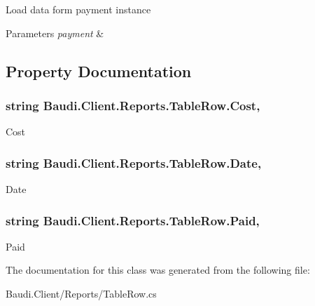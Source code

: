 Load data form payment instance 


\begin{DoxyParams}{Parameters}
{\em payment} & \\
\hline
\end{DoxyParams}


\subsection{Property Documentation}
\hypertarget{class_baudi_1_1_client_1_1_reports_1_1_table_row_abdf5f00f1621a1bb68d20a0bd5301a24}{}
\subsubsection[{Cost}]{\setlength{\rightskip}{0pt plus 5cm}string Baudi.\+Client.\+Reports.\+Table\+Row.\+Cost\hspace{0.3cm}{\ttfamily [get]}, {\ttfamily [set]}}\label{class_baudi_1_1_client_1_1_reports_1_1_table_row_abdf5f00f1621a1bb68d20a0bd5301a24}


Cost 

\hypertarget{class_baudi_1_1_client_1_1_reports_1_1_table_row_ade26b52699f4d4c5b3b1f5f02279eccd}{}
\subsubsection[{Date}]{\setlength{\rightskip}{0pt plus 5cm}string Baudi.\+Client.\+Reports.\+Table\+Row.\+Date\hspace{0.3cm}{\ttfamily [get]}, {\ttfamily [set]}}\label{class_baudi_1_1_client_1_1_reports_1_1_table_row_ade26b52699f4d4c5b3b1f5f02279eccd}


Date 

\hypertarget{class_baudi_1_1_client_1_1_reports_1_1_table_row_a975cd2bd766958ba83e4c11e9776ec4d}{}
\subsubsection[{Paid}]{\setlength{\rightskip}{0pt plus 5cm}string Baudi.\+Client.\+Reports.\+Table\+Row.\+Paid\hspace{0.3cm}{\ttfamily [get]}, {\ttfamily [set]}}\label{class_baudi_1_1_client_1_1_reports_1_1_table_row_a975cd2bd766958ba83e4c11e9776ec4d}


Paid 



The documentation for this class was generated from the following file\+:\begin{DoxyCompactItemize}
\item 
Baudi.\+Client/\+Reports/Table\+Row.\+cs\end{DoxyCompactItemize}
